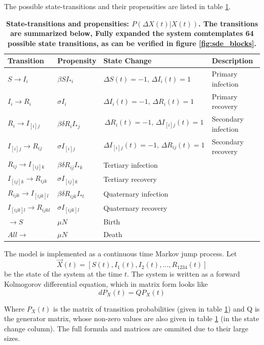 \documentclass[12pt]{article}
\begin{document}
The possible state-transitions and their  propensities are listed in table 
\ref{tab:trans}.
\begin{table}
\caption{
\bf{State-transitions and propensities: $P(\Delta X(t)|X(t))$}. The 
transitions are summarized below, Fully expanded the system comtemplates 64 
possible state transitions, as can be verified in figure \ref{fig:sde_blocks}. 
}
\label{tab:trans}
\begin{center}
\begin{tabular}[c]{l|l|l|l}
\hline
Transition & Propensity & State Change & Description\\
\hline
$S \rightarrow I_i$ & $\beta S I_{*i}$ & $\Delta S(t)=-1,\, \Delta I_i(t) = 1$ 
& Primary infection \\
$I_i \rightarrow R_i$ & $\sigma I_i$ & $\Delta I_i(t)=-1,\, \Delta R_i(t) = 1$ 
& Primary recovery\\
$R_i \rightarrow I_{[i]j}$ & $\beta \delta R_i I_{*j}$ & $$\Delta R_i(t)=-1,\, 
\Delta I_{[i]j}(t) = 1$$ & Secondary infection\\
$I_{[i]j} \rightarrow R_{ij}$ & $\sigma I_{[i]j}$ &$$\Delta I_{[i]j}(t)=-1,\, 
\Delta R_{ij}(t) = 1$$& Secondary recovery\\
$R_{ij} \rightarrow I_{[ij]k}$ & $\beta \delta R_{ij} I_{*k}$ & Tertiary 
infection\\
$I_{[ij]k} \rightarrow R_{ijk}$ & $\sigma I_{[ij]k}$ & Tertiary recovery\\
$R_{ijk} \rightarrow I_{[ijk]l}$ & $\beta \delta R_{ijk} I_{*l}$ & Quaternary 
infection\\
$I_{[ijk]l} \rightarrow R_{ijkl}$ & $\sigma I_{[ijk]l}$ & Quaternary recovery\\
$\rightarrow S$ & $\mu N$ & Birth\\
$All \rightarrow$ & $\mu N$ & Death\\
\hline
\end{tabular}
\end{center}

\end{table}

The model is implemented as a continuous time Markov jump process. Let
$$\overrightarrow{X}(t) = [S(t), I_1(t), I_2(t), \ldots, R_{1234}(t)]$$ 
be the 
state of the system at the time $t$. 
The system is written as a forward Kolmogorov differential equation, which in 
matrix form looks like
\begin{equation}
dP_X(t) = Q P_X(t) 
\end{equation}

Where $P_X(t)$ is  the matrix of transition probabilities (given in table 
\ref{tab:trans}) and Q is the generator matrix, whose non-zero values are also 
given in table \ref{tab:trans} (in the state change column). The full formula 
and matrices are ommited due to their large sizes.




\end{document}
